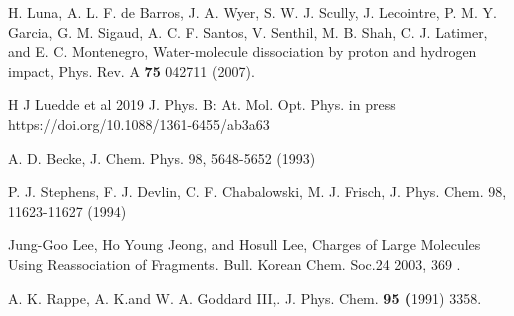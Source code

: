 \documentclass[preprint]{revtex4-2}
\begin{document}
\begin{thebibliography}{99}
H. Luna, A. L. F. de Barros, J. A. Wyer, S. W. J. Scully, J. Lecointre, 
P. M. Y. Garcia, G. M. Sigaud, A. C. F. Santos, V. Senthil, M. B. Shah, 
C. J. Latimer, and E. C. Montenegro,
Water-molecule dissociation by proton and hydrogen impact,
Phys. Rev. A \textbf{75} 042711 (2007).

H J Luedde et al 2019 
J. Phys. B: At. Mol. Opt. Phys. in press https://doi.org/10.1088/1361-6455/ab3a63

A. D. Becke, 
J. Chem. Phys. 98, 5648-5652 (1993) 

P. J. Stephens, F. J. Devlin, C. F. Chabalowski, M. J. Frisch,
J. Phys. Chem. 98, 11623-11627 (1994) 

Jung-Goo Lee, Ho Young Jeong, and Hosull Lee, Charges of
Large Molecules Using Reassociation of Fragments. 
Bull. Korean Chem. Soc.24 2003, 369 .

A. K. Rappe, A. K.and W. A. Goddard III,. 
J. Phys. Chem. \textbf{95 (}1991) 3358.







\end{thebibliography}
\end{document}
